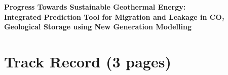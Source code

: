 \documentclass[12pts,a4paper,amsmath,amssymb,floatfix]{article}%
\begin{document}
\begin{center}
  {\Large {\bf Progress Towards Sustainable Geothermal Energy:}} \\
  {\Large {\bf Integrated Prediction Tool for Migration and Leakage in CO$_{2}$ Geological Storage using New Generation Modelling}}
\end{center}
\begin{flushright}
\end{flushright}


\section{Track Record (3 pages)}
\end{document}
